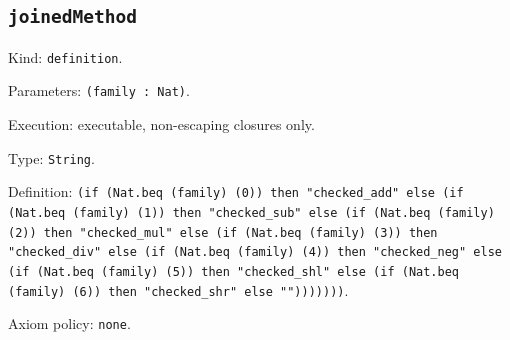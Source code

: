 \documentclass[11pt]{article}
\begin{document}
\subsection*{\texttt{joinedMethod}}
\noindent Kind: \texttt{definition}.\par
\noindent Parameters: \texttt{(family : Nat)}.\par
\noindent Execution: executable, non-escaping closures only.\par
\noindent Type: \texttt{String}.\par
\noindent Definition: \texttt{(if (Nat.beq (family) (0)) then "checked\_add" else (if (Nat.beq (family) (1)) then "checked\_sub" else (if (Nat.beq (family) (2)) then "checked\_mul" else (if (Nat.beq (family) (3)) then "checked\_div" else (if (Nat.beq (family) (4)) then "checked\_neg" else (if (Nat.beq (family) (5)) then "checked\_shl" else (if (Nat.beq (family) (6)) then "checked\_shr" else "")))))))}.\par
\noindent Axiom policy: \texttt{none}.\par
\end{document}
